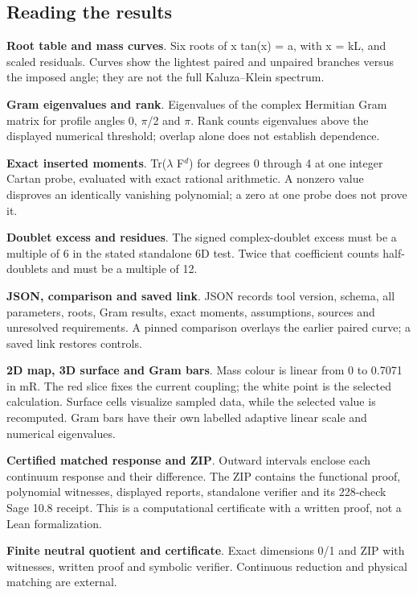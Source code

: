 \documentclass[11pt,a4paper]{article}
\begin{document}
\subsection*{Reading the results}
\textbf{Root table and mass curves}. Six roots of x tan(x) = a, with x = kL, and scaled residuals. Curves show the lightest paired and unpaired branches versus the imposed angle; they are not the full Kaluza--Klein spectrum.

\textbf{Gram eigenvalues and rank}. Eigenvalues of the complex Hermitian Gram matrix for profile angles 0, \ensuremath{\pi}/2 and \ensuremath{\pi}. Rank counts eigenvalues above the displayed numerical threshold; overlap alone does not establish dependence.

\textbf{Exact inserted moments}. Tr(\ensuremath{\lambda} F\ensuremath{{}^{d}}) for degrees 0 through 4 at one integer Cartan probe, evaluated with exact rational arithmetic. A nonzero value disproves an identically vanishing polynomial; a zero at one probe does not prove it.

\textbf{Doublet excess and residues}. The signed complex-doublet excess must be a multiple of 6 in the stated standalone 6D test. Twice that coefficient counts half-doublets and must be a multiple of 12.

\textbf{JSON, comparison and saved link}. JSON records tool version, schema, all parameters, roots, Gram results, exact moments, assumptions, sources and unresolved requirements. A pinned comparison overlays the earlier paired curve; a saved link restores controls.

\textbf{2D map, 3D surface and Gram bars}. Mass colour is linear from 0 to 0.7071 in mR. The red slice fixes the current coupling; the white point is the selected calculation. Surface cells visualize sampled data, while the selected value is recomputed. Gram bars have their own labelled adaptive linear scale and numerical eigenvalues.

\textbf{Certified matched response and ZIP}. Outward intervals enclose each continuum response and their difference. The ZIP contains the functional proof, polynomial witnesses, displayed reports, standalone verifier and its 228-check Sage 10.8 receipt. This is a computational certificate with a written proof, not a Lean formalization.

\textbf{Finite neutral quotient and certificate}. Exact dimensions 0/1 and ZIP with witnesses, written proof and symbolic verifier. Continuous reduction and physical matching are external.
\end{document}
